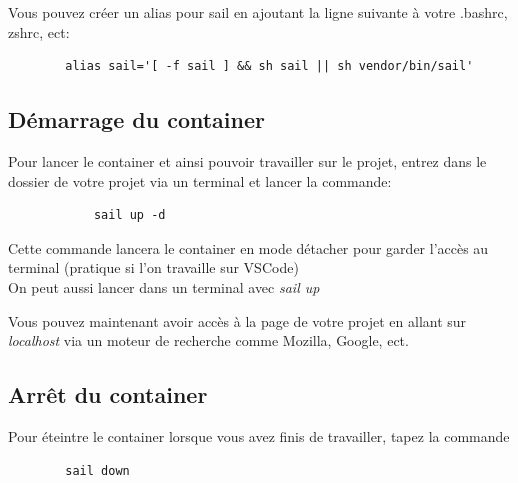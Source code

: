 \documentclass[internal]{nhitec_design}
\begin{document}
    Vous pouvez créer un alias pour sail en ajoutant la ligne suivante à votre .bashrc, zshrc, ect: 

    \begin{lstlisting}
        alias sail='[ -f sail ] && sh sail || sh vendor/bin/sail'
    \end{lstlisting}
    
    \subsection{Démarrage du container}
        Pour lancer le container et ainsi pouvoir travailler sur le projet, entrez dans le dossier de votre projet via un terminal et lancer la commande:
        
        \begin{lstlisting}
            sail up -d
        \end{lstlisting}

        Cette commande lancera le container en mode détacher pour garder l'accès au terminal (pratique si l'on travaille sur VSCode)\\
        \footnotesize{On peut aussi lancer dans un terminal avec \textit{sail up}}


        Vous pouvez maintenant avoir accès à la page de votre projet en allant sur \textit{localhost} via un moteur de recherche comme Mozilla, Google, ect.

    \subsection{Arrêt du container}

    Pour éteintre le container lorsque vous avez finis de travailler, tapez la commande

    \begin{lstlisting}
        sail down
    \end{lstlisting}
    
\end{document}
